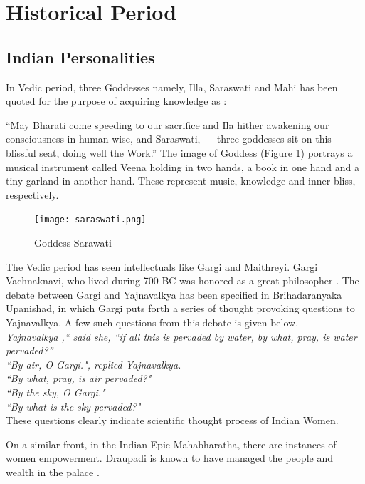 \documentclass[a4paper,10pt]{article}
\begin{document}
\section{Historical Period}

\subsection{Indian Personalities}
In Vedic period, three Goddesses namely, Illa, Saraswati and Mahi has been quoted for the purpose of acquiring knowledge as \cite{saras}: 

“May Bharati come speeding to our sacrifice and Ila hither awakening our consciousness in human wise, and Saraswati, — three goddesses sit on this blissful seat, doing well the
Work.” 
The image of Goddess (Figure 1) portrays a musical instrument called Veena holding in  two hands, a book in one hand and a tiny garland in another hand. These represent music, knowledge and inner bliss, respectively. 
\begin{center}
\begin{figure}[h]
\centering
 \texttt{[image: saraswati.png]}
 \caption{Goddess Sarawati}
\end{figure}
\end{center}

The Vedic period has seen intellectuals like Gargi and Maithreyi. Gargi Vachnaknavi, who lived during 700 BC was honored as a great philosopher \cite{Gargi}. The debate between Gargi and Yajnavalkya has been specified in Brihadaranyaka Upanishad, in which Gargi puts forth a series of thought provoking questions to Yajnavalkya. A few such questions from this debate is given below. \\


\textit{Yajnavalkya ,`` said she, ``if all this is pervaded by water, by  what, pray, is water pervaded?''} \\
\textit{``By air, O Gargi.", replied Yajnavalkya.} \\
\textit{``By what, pray, is air pervaded?" }\\
\textit{``By the sky, O Gargi."} \\
\textit{``By what is the sky pervaded?"}  \\

These questions clearly indicate scientific thought process of Indian Women. 

On a similar front, in the Indian Epic Mahabharatha, there are instances of women empowerment. Draupadi is known to have managed the people and wealth in the palace \cite{mahabharatha}. 
\end{document}
